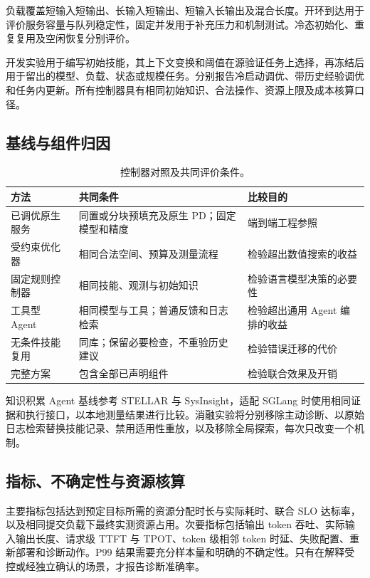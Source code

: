 \documentclass[UTF8,11pt,a4paper,fontset=windows]{ctexart}
\begin{document}
负载覆盖短输入短输出、长输入短输出、短输入长输出及混合长度。开环到达用于评价服务容量与队列稳定性，固定并发用于补充压力和机制测试。冷态初始化、重复复用及空闲恢复分别评价。

开发实验用于编写初始技能，其上下文变换和阈值在源验证任务上选择，再冻结后用于留出的模型、负载、状态或规模任务。分别报告冷启动调优、带历史经验调优和任务内更新。所有控制器具有相同初始知识、合法操作、资源上限及成本核算口径。

\subsection{基线与组件归因}
\begin{table}[H]
\centering\small
\begin{tabularx}{\linewidth}{@{}>{\raggedright\arraybackslash}p{30mm}YY@{}}
\toprule
方法 & 共同条件 & 比较目的 \\
\midrule
已调优原生服务 & 同置或分块预填充及原生 PD；固定模型和精度 & 端到端工程参照 \\
受约束优化器 & 相同合法空间、预算及测量流程 & 检验超出数值搜索的收益 \\
固定规则控制器 & 相同技能、观测与初始知识 & 检验语言模型决策的必要性 \\
工具型 Agent & 相同模型与工具；普通反馈和日志检索 & 检验超出通用 Agent 编排的收益 \\
无条件技能复用 & 同库；保留必要检查，不重验历史建议 & 检验错误迁移的代价 \\
完整方案 & 包含全部已声明组件 & 检验联合效果及开销 \\
\bottomrule
\end{tabularx}
\caption{控制器对照及共同评价条件。}
\end{table}

知识积累 Agent 基线参考 STELLAR 与 SysInsight，适配 SGLang 时使用相同证据和执行接口，以本地测量结果进行比较。消融实验将分别移除主动诊断、以原始日志检索替换技能记录、禁用适用性重放，以及移除全局探索，每次只改变一个机制。

\subsection{指标、不确定性与资源核算}
主要指标包括达到预定目标所需的资源分配时长与实际耗时、联合 SLO 达标率，以及相同提交负载下最终实测资源占用。次要指标包括输出 token 吞吐、实际输入输出长度、请求级 TTFT 与 TPOT、token 级相邻 token 时延、失败配置、重新部署和诊断动作。P99 结果需要充分样本量和明确的不确定性。只有在解释受控或经独立确认的场景，才报告诊断准确率。
\end{document}
